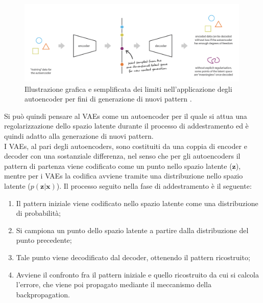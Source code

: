 
\begin{figure}[h!]
	\centering
	\includegraphics[width=0.99\textwidth]{figs/limite_autoencoder.png}
	\caption{Illustrazione grafica e semplificata dei limiti nell'applicazione degli autoencoder per fini di generazione di nuovi pattern \cite{Understanding_VAEs}.}
	\label{limite autoencoder}
\end{figure}


Si può quindi pensare al VAEs come un autoencoder per il quale si attua una regolarizzazione dello spazio latente durante il processo di addestramento ed è quindi adatto alla generazione di nuovi pattern. \\
I VAEs, al pari degli autoencoders, sono costituiti da una coppia di encoder e decoder con una sostanziale differenza, nel senso che per gli autoencoders il pattern di partenza viene codificato come un punto nello spazio latente ($\textbf{z}$), mentre per i VAEs la codifica avviene tramite una distribuzione nello spazio latente ($p(\textbf{z}|\textbf{x})$). Il processo seguito nella fase di addestramento è il seguente:
\begin{enumerate}
	\item Il pattern iniziale viene codificato nello spazio latente come una distribuzione di probabilità;
	\item Si campiona un punto dello spazio latente a partire dalla distribuzione del punto precedente;
	\item Tale punto viene decodificato dal decoder, ottenendo il pattern ricostruito;
	\item Avviene il confronto fra il pattern iniziale e quello ricostruito da cui si calcola l'errore, che viene poi propagato mediante il meccanismo della backpropagation.
\end{enumerate}

